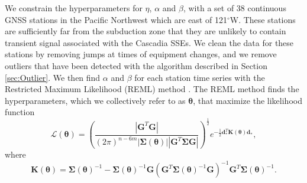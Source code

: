 \documentclass[10pt,letter]{article}
\begin{document}
We constrain the hyperparameters for $\eta$, $\alpha$ and $\beta$, with a set of 38 continuous GNSS stations in the Pacific Northwest which are east of 121$^\circ$W.  These stations are sufficiently far from the subduction zone that they are unlikely to contain transient signal associated with the Cascadia SSEs.  We clean the data for these stations by removing jumps at times of equipment changes, and we remove outliers that have been detected with the algorithm described in Section \ref{sec:Outlier}. We then find $\alpha$ and $\beta$ for each station time series with the Restricted Maximum Likelihood (REML) method \cite[e.g.,][]{Harville1974,Cressie1992,Hines2017}. The REML method finds the hyperparameters, which we collectively refer to as $\bm{\theta}$, that maximize the likelihood function
\begin{equation}\label{eq:REML}
\mathcal{L}(\bm{\theta}) = \left(\frac{\left|\bm{G}^T\bm{G}\right|}
                           {(2\pi)^{n-6m} 
                           \left| \bm{\Sigma}(\bm{\theta}) \right| 
                           \left| \bm{G}^T\bm{\Sigma}\bm{G} \right|}\right)^{\frac{1}{2}} 
                           e^{-\tfrac{1}{2}\bm{d}_*^T\bm{K}(\bm{\theta})\bm{d}_*},
\end{equation}
where
\begin{equation}
\bm{K}(\bm{\theta}) = \bm{\Sigma}(\bm{\theta})^{-1} - 
                      \bm{\Sigma}(\bm{\theta})^{-1}\bm{G}
         \left(\bm{G}^T\bm{\Sigma}(\bm{\theta})^{-1}\bm{G}\right)^{-1}
         \bm{G}^T\bm{\Sigma}(\bm{\theta})^{-1}.
\end{equation}
\end{document}
